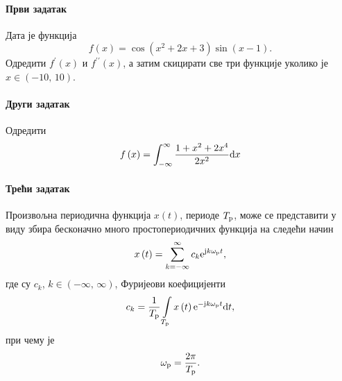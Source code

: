 \documentclass[10pt,a4paper]{article}
\renewcommand{\j}{{\rm j}}
\newcommand{\e}{{\rm e}}
\renewcommand{\d}{{\rm d}}
\newcommand{\p}{{\textnormal{p}}}
\begin{document}
\paragraph{\color{red} Први задатак}
{	Дата је функција
	\begin{equation}
		f\left(x\right)=\cos\left(x^2+2x+3\right)\sin\left(x-1\right).
	\end{equation}
	Одредити $f^{\prime}\left(x\right)$ и $f^{\prime\prime}\left(x\right)$, а затим скицирати све три функције уколико је $x\in\left(-10,\, 10\right)$.
}

\paragraph{\color{magenta}Други задатак}
Одредити
\[
f\left(x\right)=\int_{-\infty}^{\infty}\frac{1 + x^2 + 2x^4}{2x^2}\d x
\]


\paragraph{\color{blue}Трећи задатак}
	Произвољна периодична функција $x\left(t\right)$, периоде $T_{\p}$, може се представити у виду збира бесконачно много простопериодичних функција на следећи начин
	\begin{equation}
		x\left(t\right)=\sum_{k=-\infty}^{\infty}c_k \e^{\j k\omega_\p t},
	\end{equation}
	где су $c_k$, $k\in\left(-\infty,\,\infty\right)$, Фуријеови коефицијенти
	\begin{equation}\label{Eq:c_k}
		c_k=\frac{1}{T_\p}\int\limits_{T_\p}x\left(t\right)\e^{-\j k\omega_\p t}\d t,
	\end{equation}
	при чему је \[\omega_\p=\frac{2\pi}{T_\p}.\]
\end{document}
